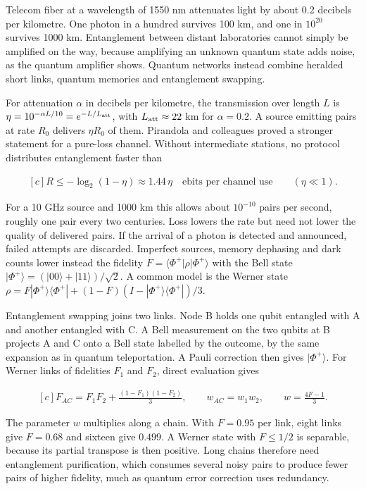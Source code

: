 \documentclass[11pt,oneside]{book}
\newenvironment{centeredalign}{\[\begin{gathered}[c]}{\end{gathered}\]}
\begin{document}
\label{topic:quantum-network}

Telecom fiber at a wavelength of 1550 nm attenuates light by about 0.2 decibels per kilometre. One photon in a hundred survives 100 km, and one in \(10^{20}\) survives 1000 km. Entanglement between distant laboratories cannot simply be amplified on the way, because amplifying an unknown quantum state adds noise, as the quantum amplifier shows. Quantum networks instead combine heralded short links, quantum memories and entanglement swapping.

For attenuation \(\alpha\) in decibels per kilometre, the transmission over length \(L\) is \(\eta=10^{-\alpha L/10}=e^{-L/L_{\rm att}}\), with \(L_{\rm att}\approx22\) km for \(\alpha=0.2\). A source emitting pairs at rate \(R_0\) delivers \(\eta R_0\) of them. Pirandola and colleagues proved a stronger statement for a pure-loss channel. Without intermediate stations, no protocol distributes entanglement faster than

\begin{centeredalign}
R\leq-\log_2(1-\eta)\approx1.44\,\eta\quad\text{ebits per channel use}\qquad(\eta\ll1).
\end{centeredalign}

For a 10 GHz source and 1000 km this allows about \(10^{-10}\) pairs per second, roughly one pair every two centuries. Loss lowers the rate but need not lower the quality of delivered pairs. If the arrival of a photon is detected and announced, failed attempts are discarded. Imperfect sources, memory dephasing and dark counts lower instead the fidelity \(F=\langle\Phi^+|\rho|\Phi^+\rangle\) with the Bell state \(|\Phi^+\rangle=(|00\rangle+|11\rangle)/\sqrt2\). A common model is the Werner state \(\rho=F|\Phi^+\rangle\langle\Phi^+|+(1-F)(I-|\Phi^+\rangle\langle\Phi^+|)/3\).

Entanglement swapping joins two links. Node B holds one qubit entangled with A and another entangled with C. A Bell measurement on the two qubits at B projects A and C onto a Bell state labelled by the outcome, by the same expansion as in quantum teleportation. A Pauli correction then gives \(|\Phi^+\rangle\). For Werner links of fidelities \(F_1\) and \(F_2\), direct evaluation gives

\begin{centeredalign}
F_{AC}=F_1F_2+\frac{(1-F_1)(1-F_2)}{3},\qquad w_{AC}=w_1w_2,\qquad w=\frac{4F-1}{3}.
\end{centeredalign}

The parameter \(w\) multiplies along a chain. With \(F=0.95\) per link, eight links give \(F=0.68\) and sixteen give \(0.499\). A Werner state with \(F\leq1/2\) is separable, because its partial transpose is then positive. Long chains therefore need entanglement purification, which consumes several noisy pairs to produce fewer pairs of higher fidelity, much as quantum error correction uses redundancy.
\end{document}
